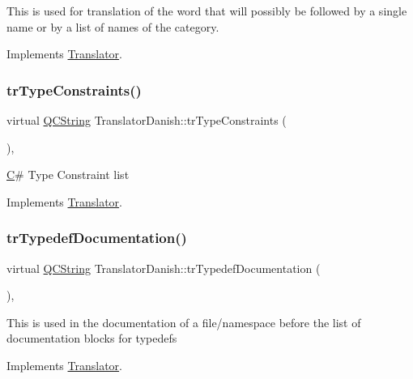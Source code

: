 This is used for translation of the word that will possibly be followed by a single name or by a list of names of the category. 

Implements \mbox{\hyperlink{class_translator}{Translator}}.

\mbox{\label{class_translator_danish_a170dceaf0c66de4a6057aef089fe8102}} 
\subsubsection{\texorpdfstring{trTypeConstraints()}{trTypeConstraints()}}
{\footnotesize\ttfamily virtual \mbox{\hyperlink{class_q_c_string}{Q\+C\+String}} Translator\+Danish\+::tr\+Type\+Constraints (\begin{DoxyParamCaption}{ }\end{DoxyParamCaption})\hspace{0.3cm}{\ttfamily [inline]}, {\ttfamily [virtual]}}

\mbox{\hyperlink{class_c}{C}}\# Type Constraint list 

Implements \mbox{\hyperlink{class_translator}{Translator}}.

\mbox{\label{class_translator_danish_a740284318dfd8030d3b4aef905923f02}} 
\subsubsection{\texorpdfstring{trTypedefDocumentation()}{trTypedefDocumentation()}}
{\footnotesize\ttfamily virtual \mbox{\hyperlink{class_q_c_string}{Q\+C\+String}} Translator\+Danish\+::tr\+Typedef\+Documentation (\begin{DoxyParamCaption}{ }\end{DoxyParamCaption})\hspace{0.3cm}{\ttfamily [inline]}, {\ttfamily [virtual]}}

This is used in the documentation of a file/namespace before the list of documentation blocks for typedefs 

Implements \mbox{\hyperlink{class_translator}{Translator}}.

